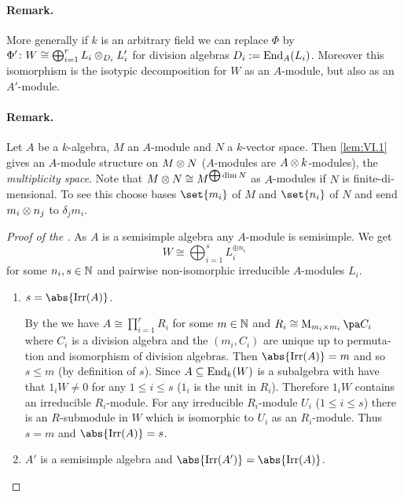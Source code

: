 \documentclass[12pt,a4paper]{scrartcl}
\theoremstyle{cplain}
\theoremstyle{cplain}
\theoremstyle{cplain}
\theoremstyle{definition}
\begin{document}
\begin{otherlanguage}{english}
\paragraph{Remark.}
More generally if $k$ is an arbitrary field we can replace $\Phi$ by $\Phi'\colon W\cong \bigoplus_{i=1}^rL_i\otimes_{D_i}L_i'$ for division algebras $D_i := \operatorname{End}_A(L_i)$. Moreover this isomorphism is the isotypic decomposition for $W$ as an $A$-module, but also as an $A'$-module.

\paragraph{Remark.}
Let $A$ be a $k$-algebra, $M$ an $A$-module and $N$ a $k$-vector space. Then \cref{lem:VI.1} gives an $A$-module structure on $M\otimes N$ ($A$-modules are $A\otimes k$-modules), the \emph{multiplicity space}. Note that $M\otimes N \cong M^{\bigoplus \dim N}$ as $A$-modules if $N$ is finite-dimensional. To see this choose bases $\set{m_i}$ of $M$ and $\set{n_i}$ of $N$ and send $m_i\otimes n_j$ to $\delta_jm_i$.

\begin{proof}[Proof of the ]
  As $A$ is a semisimple algebra any $A$-module is semisimple. We get \begin{equation}W\cong\bigoplus_{i=1}^sL_i^{\oplus n_i}\tag{*}\label{eq:dct}\end{equation} for some $n_i,s\in \mathbb N$ and pairwise non-isomorphic irreducible $A$-modules $L_i$.
  \begin{enumerate}[label=\arabic*.]
    \item $s = \abs{\Irr(A)}$.
    
    By the  we have $A \cong \prod_{i=1}^rR_i$ for some $m\in\mathbb N$ and $R_i \cong \Mat{m_i}{C_i}$ where $C_i$ is a division algebra and the $(m_i,C_i)$ are unique up to permutation and isomorphism of division algebras. Then $\abs{\Irr(A)} = m$ and so $s \le m$ (by definition of $s$). Since $A \subseteq \operatorname{End}_k(W)$ is a subalgebra with have that $1_iW \neq 0$ for any $1\le i \le s$ ($1_i$ is the unit in $R_i$). Therefore $1_iW$ contains an irreducible $R_i$-module. For any irreducible $R_i$-module $U_i$ ($1\le i\le s$) there is an $R$-submodule in $W$ which is isomorphic to $U_i$ as an $R_i$-module. Thus $s=m$ and $\abs{\Irr(A)} = s$.
    \item \label{thm:dct:proof:2} $A'$ is a semisimple algebra and $\abs{\Irr(A')} = \abs{\Irr(A)}$.
    

\end{enumerate}
\end{proof}
\end{otherlanguage}
\end{document}
